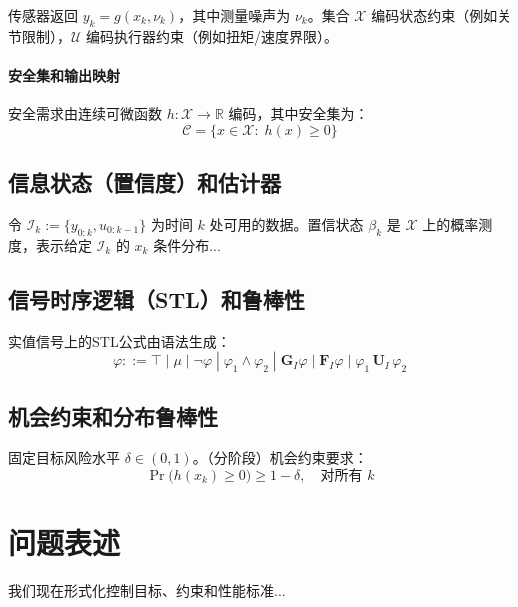 \documentclass[12pt,a4paper]{ctexart}
\numberwithin{equation}{section}
\begin{document}
传感器返回 $y_k=g(x_k,\nu_k)$，其中测量噪声为 $\nu_k$。集合 $\mathcal{X}$ 编码状态约束（例如关节限制），$\mathcal{U}$ 编码执行器约束（例如扭矩/速度界限）。

\paragraph*{安全集和输出映射}
安全需求由连续可微函数 $h:\mathcal{X}\rightarrow\mathbb{R}$ 编码，其中安全集为：
\begin{equation}
    \mathcal{C} = \{x\in\mathcal{X}:\; h(x)\ge 0\}
    \label{eq:safe-set}
\end{equation}

\subsection{信息状态（置信度）和估计器}

令 $\mathcal{I}_k:=\{y_{0:k},u_{0:k-1}\}$ 为时间 $k$ 处可用的数据。置信状态 $\beta_k$ 是 $\mathcal{X}$ 上的概率测度，表示给定 $\mathcal{I}_k$ 的 $x_k$ 条件分布...

\subsection{信号时序逻辑（STL）和鲁棒性}

实值信号上的STL公式由语法生成：
\begin{equation}
    \varphi ::= \top \;|\; \mu \;|\; \neg\varphi \;|\; \varphi_1\wedge\varphi_2 \;|\; \mathbf{G}_{I}\varphi \;|\; \mathbf{F}_{I}\varphi \;|\; \varphi_1 \,\mathbf{U}_{I}\, \varphi_2
\end{equation}

\subsection{机会约束和分布鲁棒性}

固定目标风险水平 $\delta\in(0,1)$。（分阶段）机会约束要求：
\begin{equation}
    \Pr\big(h(x_k)\ge 0\big) \ge 1-\delta, \quad \text{对所有 } k
\end{equation}

\clearpage
\section{问题表述}

我们现在形式化控制目标、约束和性能标准...
\end{document}
